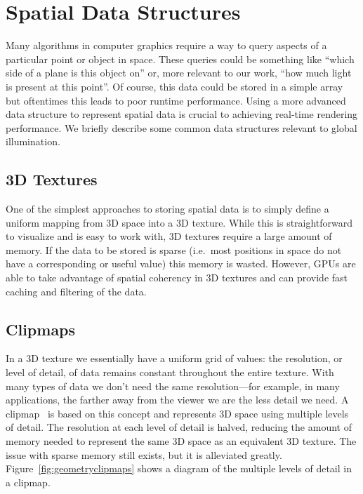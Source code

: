 
\section{Spatial Data Structures}
Many algorithms in computer graphics require a way to query aspects of a particular point or object in space. These queries could be something like ``which side of a plane is this object on'' or, more relevant to our work, ``how much light is present at this point''. Of course, this data could be stored in a simple array but oftentimes this leads to poor runtime performance. Using a more advanced data structure to represent spatial data is crucial to achieving real-time rendering performance. We briefly describe some common data structures relevant to global illumination.

\subsection{3D Textures}
One of the simplest approaches to storing spatial data is to simply define a uniform mapping from 3D space into a 3D texture. While this is straightforward to visualize and is easy to work with, 3D textures require a large amount of memory. If the data to be stored is sparse (i.e.\ most positions in space do not have a corresponding or useful value) this memory is wasted. However, GPUs are able to take advantage of spatial coherency in 3D textures and can provide fast caching and filtering of the data.

\subsection{Clipmaps}
In a 3D texture we essentially have a uniform grid of values: the resolution, or level of detail, of data remains constant throughout the entire texture. With many types of data we don't need the same resolution---for example, in many applications, the farther away from the viewer we are the less detail we need. A clipmap~\cite{Tanner:1998:CVM:280814.280855, Losasso:2004:GCT:1015706.1015799} is based on this concept and represents 3D space using multiple levels of detail. The resolution at each level of detail is halved, reducing the amount of memory needed to represent the same 3D space as an equivalent 3D texture. The issue with sparse memory still exists, but it is alleviated greatly. Figure~\ref{fig:geometryclipmaps} shows a diagram of the multiple levels of detail in a clipmap.

